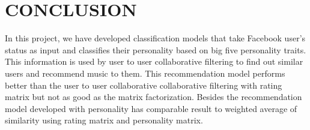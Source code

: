 \newpage
\section{CONCLUSION}
In this project, we have developed classification models that take Facebook user's status as input and classifies their personality based on big five personality traits. This information is used by user to user collaborative filtering to find out similar users and recommend music to them. This recommendation model performs better than the user to user collaborative collaborative filtering with rating matrix but not as good as the matrix factorization. Besides the recommendation model developed with personality has comparable result to weighted average of similarity using rating matrix and personality matrix.